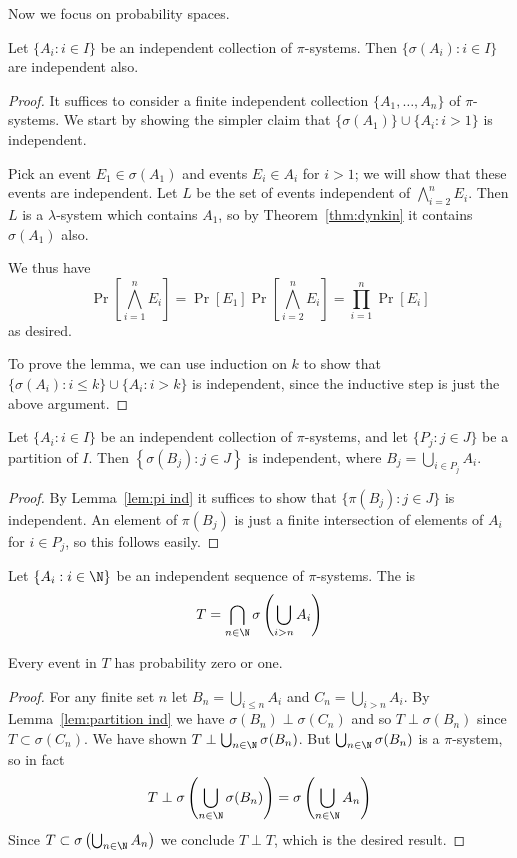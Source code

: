 \documentclass[11pt,a4paper]{article}
\begin{document}
Now we focus on probability spaces.

\begin{lemma}
  \label{lem:pi ind}
  Let $\{A_i : i \in I\}$ be an independent collection of $\pi$-systems.
  Then $\{\sigma(A_i) : i \in I\}$ are independent also.
\end{lemma}
\begin{proof}
  It suffices to consider a finite independent collection $\{A_1, \dots, A_n\}$ of $\pi$-systems.
  We start by showing the simpler claim that $\{\sigma(A_1)\} \cup \{A_i : i > 1\}$ is independent.

  Pick an event $E_1 \in \sigma(A_1)$
  and events $E_i \in A_i$ for $i > 1$; we will show that these events are independent.
  Let $L$ be the set of events independent of $\bigwedge_{i=2}^n E_i$.
  Then $L$ is a $\lambda$-system which contains $A_1$, so by Theorem~\ref{thm:dynkin} it contains $\sigma(A_1)$ also.

  We thus have
  \[
  \Pr\left[\bigwedge_{i=1}^n E_i\right]
   = \Pr[E_1]\Pr\left[\bigwedge_{i=2}^n E_i\right]
   = \prod_{i=1}^{n} \Pr[E_i]
  \]
  as desired.

  To prove the lemma, we can use induction on $k$ to show that $\{\sigma(A_i) : i \le k\} \cup \{A_i : i > k\}$ is independent, since the inductive step is just the above argument.
\end{proof}

\begin{lemma}
  \label{lem:partition ind}
  Let $\{A_i : i \in I\}$ be an independent collection of $\pi$-systems,
  and let $\{P_j : j \in J\}$ be a partition of $I$.
  Then $\left\{\sigma(B_j) : j \in J\right\}$ is independent, where $B_j = \bigcup_{i \in P_j} A_i$.
\end{lemma}
\begin{proof}
  By Lemma~\ref{lem:pi ind} it suffices to show that
  $\{\pi(B_j) : j \in J\}$ is independent.
  An element of $\pi(B_j)$ is just a finite intersection
  of elements of $A_i$ for $i \in P_j$,
  so this follows easily.
\end{proof}

\begin{definition}
  Let $\{A_i : i \in \N\}$ be an independent sequence of $\pi$-systems.
  The  is \[T = \bigcap_{n \in \N} \sigma\left(\bigcup_{i > n} A_i\right)\]
\end{definition}

\begin{theorem}
  Every event in $T$ has probability zero or one.
\end{theorem}
\begin{proof}
  For any finite set $n$ let $B_n = \bigcup_{i \le n} A_i$ and $C_n = \bigcup_{i > n} A_i$.
  By Lemma~\ref{lem:partition ind} we have $\sigma(B_n) \perp \sigma(C_n)$ and so $T \perp \sigma(B_n)$ since $T \subset \sigma(C_n)$.
  We have shown $T \perp \bigcup_{n \in \N} \sigma(B_n)$.  But $\bigcup_{n \in \N} \sigma(B_n)$ is a $\pi$-system, so in fact
  \[T \perp \sigma\left(\bigcup_{n \in \N} \sigma(B_n)\right) = \sigma\left(\bigcup_{n \in \N} A_n\right)\]
  Since $T \subset \sigma\left(\bigcup_{n \in \N} A_n\right)$
  we conclude $T \perp T$, which is the desired result.
\end{proof}
\end{document}
